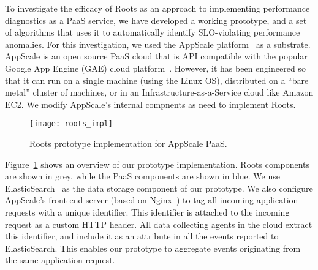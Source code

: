 To investigate the efficacy of Roots as an approach to
implementing performance diagnostics as a PaaS service, we have developed a
working prototype, and a set of algorithms that uses it to automatically
identify SLO-violating performance anomalies.
For this investigation, we used the AppScale
platform~\cite{6488671} as a substrate. AppScale is an open source PaaS cloud
that is API compatible
with the popular Google App Engine (GAE) cloud platform~\cite{gae}.  
However, it has been engineered so that it can run on a
single machine (using the Linux OS), distributed on a ``bare metal'' cluster
of machines, or in an Infrastructure-as-a-Service cloud like Amazon EC2.
We modify AppScale's internal compnents as need to implement Roots.


\begin{figure}
\centering
\texttt{[image: roots\_impl]}
\caption{Roots prototype implementation for AppScale PaaS.}
\label{fig:roots_impl}
\end{figure}

Figure~\ref{fig:roots_impl} shows an overview of our prototype implementation. Roots components
are shown in grey, while the PaaS components are shown in blue.
We use ElasticSearch~\cite{elasticsearch} as the data storage component of our prototype. 
We also configure AppScale's front-end server (based on Nginx~\cite{XXX}) to tag all incoming application requests
with a unique identifier. This identifier is attached to the incoming request as a custom HTTP header.
All data collecting agents in the cloud extract this identifier, and include it as an attribute
in all the events reported to ElasticSearch. This enables our prototype to aggregate events originating
from the same application request.

